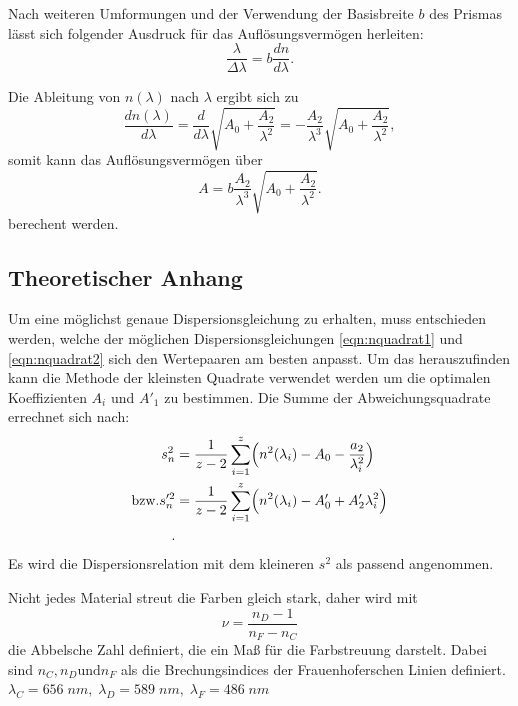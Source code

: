 Nach weiteren Umformungen und der Verwendung der Basisbreite $b$ des
Prismas lässt sich folgender Ausdruck für das Auflösungsvermögen
herleiten:
\begin{equation}
  \frac{\lambda}{\Delta \lambda}=b\frac{dn}{d\lambda}.
  \label{eqn:auflösungsvermögen}
\end{equation}

Die Ableitung von $n(\lambda)$ nach $\lambda$ ergibt sich zu
\begin{equation}
  \frac{dn(\lambda)}{d\lambda}=\frac{d}{d\lambda}\sqrt{A_0+\frac{A_2}{\lambda^2}}
  =-\frac{A_2}{\lambda^3}\sqrt{A_0+\frac{A_2}{\lambda^2}},
\end{equation}
somit kann das Auflösungsvermögen über
\begin{equation}
  A=b\frac{A_2}{\lambda^3}{\sqrt{A_0+\frac{A_2}{\lambda^2}}}.
  \label{eqn:auflösungsver}
\end{equation}
berechent werden.

\subsection{Theoretischer Anhang}
Um eine möglichst genaue Dispersionsgleichung zu erhalten, muss
entschieden werden, welche der möglichen Dispersionsgleichungen
\ref{eqn:nquadrat1} und \ref{eqn:nquadrat2} sich den Wertepaaren
am besten anpasst. Um das herauszufinden kann die Methode der
kleinsten Quadrate verwendet werden um die optimalen Koeffizienten
$A_i$ und $A'_1$ zu bestimmen.
Die Summe der Abweichungsquadrate errechnet sich nach:
\begin{align}
  s_{n}^{2}&=\frac{1}{z-2}\sum_{i=1}^{z} \Bigl(n^2(\lambda_i)-A_0-\frac{a_2}{\lambda_{i}^{2}}\Bigr) \\
  \text{bzw.}
  s_{n}'^{2}&=\frac{1}{z-2}\sum_{i=1}^{z} \Bigl(n^2(\lambda_i)-A'_0+A'_{2}\lambda_{i}^{2}\Bigr) \\.
  \label{eqn:abweichungquadrat}
\end{align}
Es wird die Dispersionsrelation mit dem kleineren $s^2$ als passend angenommen.

Nicht jedes Material streut die Farben gleich stark, daher wird mit
\begin{equation}
  \nu=\frac{n_D -1}{n_F-n_C}
  \label{eqn:abbel}
\end{equation}
die Abbelsche Zahl definiert, die ein Maß für die Farbstreuung darstelt.
Dabei sind $n_C, n_D \text{und} n_F$ als die Brechungsindices der Frauenhoferschen
Linien definiert.\\
$\lambda_C=656\;nm,\;\lambda_D=589\;nm,\;\lambda_F=486\;nm$
